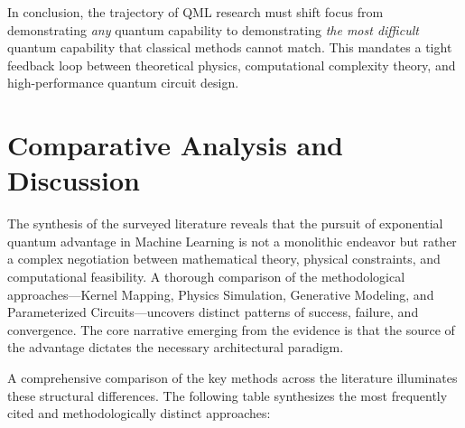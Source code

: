 \documentclass{article}
\begin{document}
In conclusion, the trajectory of QML research must shift focus from demonstrating \textit{any} quantum capability to demonstrating \textit{the most difficult} quantum capability that classical methods cannot match. This mandates a tight feedback loop between theoretical physics, computational complexity theory, and high-performance quantum circuit design.

\section{Comparative Analysis and Discussion}

\label{sec:comparative\_analysis\_and\_discussion}

The synthesis of the surveyed literature reveals that the pursuit of exponential quantum advantage in Machine Learning is not a monolithic endeavor but rather a complex negotiation between mathematical theory, physical constraints, and computational feasibility. A thorough comparison of the methodological approaches---Kernel Mapping, Physics Simulation, Generative Modeling, and Parameterized Circuits---uncovers distinct patterns of success, failure, and convergence. The core narrative emerging from the evidence is that the source of the advantage dictates the necessary architectural paradigm.

A comprehensive comparison of the key methods across the literature illuminates these structural differences. The following table synthesizes the most frequently cited and methodologically distinct approaches:
\end{document}
